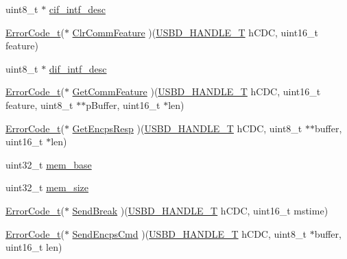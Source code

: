 \begin{DoxyCompactItemize}
\item 
uint8\+\_\+t $\ast$ \hyperlink{structUSBD__CDC__INIT__PARAM_a84c3d40976a44e3dde322e98480776a3}{cif\+\_\+intf\+\_\+desc}
\item 
\hyperlink{error_8h_a905255056c349318139d94aa4523d516}{Error\+Code\+\_\+t}($\ast$ \hyperlink{structUSBD__CDC__INIT__PARAM_a4564c92d967b03f85870e940ad7d67b3}{Clr\+Comm\+Feature} )(\hyperlink{group__USBD__Core_gafdbb2204d929cb9d75736bd2b42342ac}{U\+S\+B\+D\+\_\+\+H\+A\+N\+D\+L\+E\+\_\+T} h\+C\+DC, uint16\+\_\+t feature)
\item 
uint8\+\_\+t $\ast$ \hyperlink{structUSBD__CDC__INIT__PARAM_a473ac609a0fe0a78826b20a947de7df1}{dif\+\_\+intf\+\_\+desc}
\item 
\hyperlink{error_8h_a905255056c349318139d94aa4523d516}{Error\+Code\+\_\+t}($\ast$ \hyperlink{structUSBD__CDC__INIT__PARAM_ab8edfef92cb0d830a742a68d96e10952}{Get\+Comm\+Feature} )(\hyperlink{group__USBD__Core_gafdbb2204d929cb9d75736bd2b42342ac}{U\+S\+B\+D\+\_\+\+H\+A\+N\+D\+L\+E\+\_\+T} h\+C\+DC, uint16\+\_\+t feature, uint8\+\_\+t $\ast$$\ast$p\+Buffer, uint16\+\_\+t $\ast$len)
\item 
\hyperlink{error_8h_a905255056c349318139d94aa4523d516}{Error\+Code\+\_\+t}($\ast$ \hyperlink{structUSBD__CDC__INIT__PARAM_a50f19d3a3bfac1e1d6525d44ecb8063a}{Get\+Encps\+Resp} )(\hyperlink{group__USBD__Core_gafdbb2204d929cb9d75736bd2b42342ac}{U\+S\+B\+D\+\_\+\+H\+A\+N\+D\+L\+E\+\_\+T} h\+C\+DC, uint8\+\_\+t $\ast$$\ast$buffer, uint16\+\_\+t $\ast$len)
\item 
uint32\+\_\+t \hyperlink{structUSBD__CDC__INIT__PARAM_a2d9d28e9450cf152c1826a3669015014}{mem\+\_\+base}
\item 
uint32\+\_\+t \hyperlink{structUSBD__CDC__INIT__PARAM_a3616334a22f3ae9a30029f572920b9f4}{mem\+\_\+size}
\item 
\hyperlink{error_8h_a905255056c349318139d94aa4523d516}{Error\+Code\+\_\+t}($\ast$ \hyperlink{structUSBD__CDC__INIT__PARAM_a1ae8501d22f581ca8f756f068fb1c506}{Send\+Break} )(\hyperlink{group__USBD__Core_gafdbb2204d929cb9d75736bd2b42342ac}{U\+S\+B\+D\+\_\+\+H\+A\+N\+D\+L\+E\+\_\+T} h\+C\+DC, uint16\+\_\+t mstime)
\item 
\hyperlink{error_8h_a905255056c349318139d94aa4523d516}{Error\+Code\+\_\+t}($\ast$ \hyperlink{structUSBD__CDC__INIT__PARAM_a3722a6599dc056cd6b3343b9fbcf04b0}{Send\+Encps\+Cmd} )(\hyperlink{group__USBD__Core_gafdbb2204d929cb9d75736bd2b42342ac}{U\+S\+B\+D\+\_\+\+H\+A\+N\+D\+L\+E\+\_\+T} h\+C\+DC, uint8\+\_\+t $\ast$buffer, uint16\+\_\+t len)
\item 

\end{DoxyCompactItemize}
